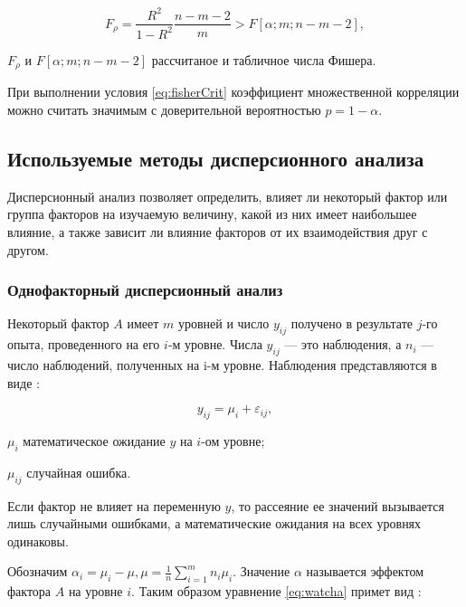 \begin{equation}
\label{eq:fisherCrit}
F_\rho = \frac{R^2}{1-R^2} \frac{n - m - 2}{m} > F\left[{\alpha;m;n-m-2}\right],
\end{equation}
\begin{eqexpl}[60mm]
\item{$F_\rho$ и $F\left[\alpha;m;n-m-2\right]$} рассчитаное и табличное числа Фишера.
\end{eqexpl}

При выполнении условия \eqref{eq:fisherCrit} коэффициент множественной корреляции можно считать значимым с доверительной вероятностью $p = 1 - \alpha$.

\subsection{Используемые методы дисперсионного анализа}

Дисперсионный анализ позволяет определить, влияет ли некоторый фактор или группа факторов на изучаемую величину, какой из них имеет наибольшее влияние, а также зависит ли влияние факторов от их взаимодействия друг с другом. \cite{disperMethod}

\subsubsection{Однофакторный дисперсионный анализ}
Некоторый фактор $A$ имеет $m$ уровней и число $y_{ij}$ получено в результате $j$-го опыта, проведенного на его $i$-м уровне. Числа $y_{ij}$ --- это наблюдения, а $n_i$ --- число наблюдений, полученных на i-м уровне. Наблюдения представляются в виде \cite{disperMethod}:

\begin{equation}
\label{eq:watcha}
y_{ij} = \mu_i+\varepsilon_{ij},
\end{equation}
\begin{eqexpl}[15mm]
\item{$\mu_i$} математическое ожидание $y$ на $i$-ом уровне;
\item{$\mu_{ij}$} случайная ошибка.
\end{eqexpl}

Если фактор не влияет на переменную $y$, то рассеяние ее значений вызывается лишь случайными ошибками, а математические ожидания на всех уровнях одинаковы. \cite{disperMethod}

Обозначим $\alpha_i=\mu_i-\mu, \mu=\frac{1}{n}\sum_{i=1}^{m}{n_i\mu_i}$. Значение $\alpha$ называется эффектом фактора $A$ на уровне $i$. Таким образом уравнение \eqref{eq:watcha} примет вид \cite{disperMethod}:

